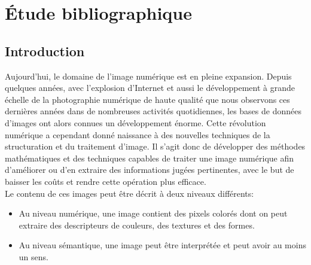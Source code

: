 
\chapter{Étude bibliographique} %

\label{ChapterX} %


\section{Introduction}
Aujourd’hui, le domaine de l'image numérique est en pleine expansion. Depuis quelques années, avec l'explosion d'Internet et aussi le développement à grande échelle de la photographie numérique de haute qualité que nous observons ces dernières années dans de nombreuses activités quotidiennes, les bases de données d'images ont alors connues un développement énorme. Cette révolution numérique a cependant donné naissance à des nouvelles techniques de la structuration et du traitement d'image. Il s'agit donc de développer des méthodes mathématiques et des techniques capables de traiter une image numérique afin d’améliorer ou d’en extraire des informations jugées pertinentes, avec le but de baisser les coûts et rendre cette opération plus efficace.\\

Le contenu de ces images peut être décrit à deux niveaux différents: 
\begin{itemize}
	\item Au niveau numérique, une image contient des pixels colorés dont on peut extraire des descripteurs de couleurs, des textures et des formes. 
	\item Au niveau sémantique, une image peut être interprétée et peut avoir au moins un sens. 
\end{itemize}

